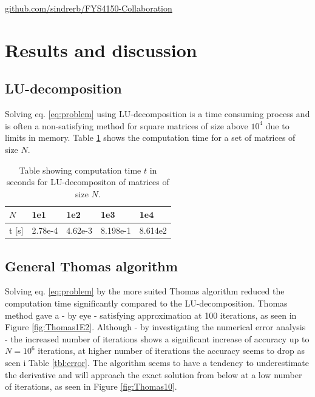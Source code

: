 \documentclass[twoside,twocolumn]{article}
\begin{document}
\begin{center}
 \href{https://github.com/sindrerb/FYS4150-Collaboration}{github.com/sindrerb/FYS4150-Collaboration}
\end{center}

\newpage

\section{Results and discussion}

\subsection{LU-decomposition}
Solving eq. \ref{eq:problem} using LU-decomposition is a time consuming process and is often a non-satisfying method for square matrices of size above $10^4$ due to limits in memory. Table \ref{tbl:time_LU} shows the computation time for a set of matrices of size $N$.

\begin{table}[h]
\begin{tabular}{|l|l|l|l|l|} \hline
$N$ & 1e1 & 1e2 & 1e3 & 1e4\\ \hline
t [s] & 2.78e-4 &4.62e-3 & 8.198e-1 & 8.614e2\\ \hline
\end{tabular}
\caption{Table showing computation time $t$ in seconds for LU-decompositon of matrices of size $N$.} \label{tbl:time_LU}
\end{table}

\subsection{General Thomas algorithm}

Solving eq. \ref{eq:problem} by the more suited Thomas algorithm reduced the computation time significantly compared to the LU-decomposition. Thomas method gave a - by eye - satisfying approximation at 100 iterations, as seen in Figure \ref{fig:Thomas1E2}. Although - by investigating the numerical error analysis - the increased number of iterations shows a significant increase of accuracy up to $N=10^6$ iterations, at higher number of iterations the accuracy seems to drop as seen i Table \ref{tbl:error}.
The algorithm seems to have a tendency to underestimate the derivative and will approach the exact solution from below at a low number of iterations, as seen in Figure \ref{fig:Thomas10}.
\end{document}
